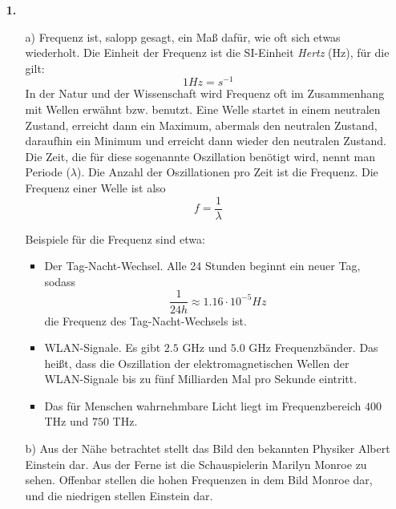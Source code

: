 \documentclass [a4paper,11pt]{article}
\author{\authorinfotitle}
\title{\titleinfo}
\date{\today}
\begin{document}
\maketitle
    \begin{enumerate}
        \item[\textbf{1.}]
            \begin{enumerate}
                \item[a)]
                Frequenz ist, salopp gesagt, ein Maß dafür, wie oft sich etwas wiederholt.
                Die Einheit der Frequenz ist die SI-Einheit \textit{Hertz} (Hz), für die gilt:
                $$1 Hz = s^{-1}$$
                In der Natur und der Wissenschaft wird Frequenz oft im Zusammenhang mit Wellen
                erwähnt bzw. benutzt. Eine Welle startet in einem neutralen Zustand,
                erreicht dann ein Maximum, abermals den neutralen Zustand, daraufhin
                ein Minimum und erreicht dann wieder den neutralen Zustand.
                Die Zeit, die für diese sogenannte Oszillation benötigt wird,
                nennt man Periode ($\lambda$). Die Anzahl der Oszillationen pro Zeit ist die Frequenz.
                Die Frequenz einer Welle ist also $$ f = \frac{1}{\lambda} $$

                Beispiele für die Frequenz sind etwa:

                \begin{itemize}
                    \item Der Tag-Nacht-Wechsel. Alle 24 Stunden beginnt ein neuer Tag, sodass
                        $$ \frac{1}{24h} \approx 1.16 \cdot 10^{-5} Hz $$
                        die Frequenz des Tag-Nacht-Wechsels ist.
                    \item WLAN-Signale. Es gibt $2.5$ GHz und $5.0$ GHz Frequenzbänder. Das heißt,
                        dass die Oszillation der elektromagnetischen Wellen der WLAN-Signale bis zu
                        fünf Milliarden Mal pro Sekunde eintritt.
                    \item Das für Menschen wahrnehmbare Licht liegt im Frequenzbereich $400$ THz
                        und $750$ THz.
                \end{itemize}

                \item[b)]
                Aus der Nähe betrachtet stellt das Bild den bekannten Physiker Albert Einstein dar.
                Aus der Ferne ist die Schauspielerin Marilyn Monroe zu sehen.
                Offenbar stellen die hohen Frequenzen in dem Bild Monroe dar, und die
                niedrigen stellen Einstein dar.
            \end{enumerate}
    \end{enumerate}
\end{document}
